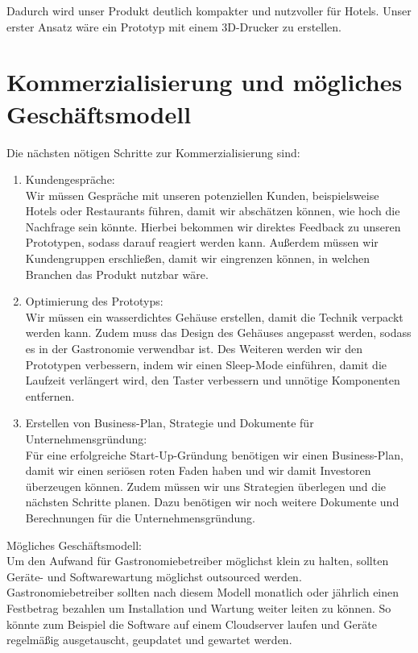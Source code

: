 Dadurch wird unser Produkt deutlich kompakter und nutzvoller für Hotels. Unser erster Ansatz wäre ein Prototyp mit einem 3D-Drucker zu erstellen. 
\section{Kommerzialisierung und mögliches Geschäftsmodell}
Die nächsten nötigen Schritte zur Kommerzialisierung sind:
\begin{enumerate}
    \item Kundengespräche:\\
    Wir müssen Gespräche mit unseren potenziellen Kunden, beispielsweise Hotels oder Restaurants führen, damit wir abschätzen können, wie hoch die Nachfrage sein könnte. Hierbei bekommen wir direktes Feedback zu unseren Prototypen, sodass darauf reagiert werden kann. Außerdem müssen wir Kundengruppen erschließen, damit wir eingrenzen können, in welchen Branchen das Produkt nutzbar wäre.
    \item Optimierung des Prototyps:\\
    Wir müssen ein wasserdichtes Gehäuse erstellen, damit die Technik verpackt werden kann. Zudem muss das Design des Gehäuses angepasst werden, sodass es in der Gastronomie verwendbar ist. Des Weiteren werden wir den Prototypen verbessern, indem wir einen Sleep-Mode einführen, damit die Laufzeit verlängert wird, den Taster verbessern und unnötige Komponenten entfernen.
    \item Erstellen von Business-Plan, Strategie und Dokumente für Unternehmensgründung:\\
    Für eine erfolgreiche Start-Up-Gründung benötigen wir einen Business-Plan, damit wir einen seriösen roten Faden haben und wir damit Investoren überzeugen können. Zudem müssen wir uns Strategien überlegen und die nächsten Schritte planen. Dazu benötigen wir noch weitere Dokumente und Berechnungen für die Unternehmensgründung.
\end{enumerate}

 Mögliches Geschäftsmodell: \\
Um den Aufwand für Gastronomiebetreiber möglichst klein zu halten, sollten Geräte- und Softwarewartung möglichst outsourced werden. Gastronomiebetreiber sollten nach diesem Modell monatlich oder jährlich einen Festbetrag bezahlen um Installation und Wartung weiter leiten zu können. So könnte zum Beispiel die Software auf einem Cloudserver laufen und Geräte regelmäßig ausgetauscht, geupdatet und gewartet werden.

\nocite{online:getting-started-load-cells}
\nocite{doc:getting-started}
\nocite{wiki:load-cell}
\nocite{wiki:Force-sensing-resistor}
\nocite{wiki:Piezoelectric-sensor}
\nocite{online:ic880a-gateway}
\nocite{online:datalink}
\nocite{online:lorawan-security}
\nocite{excel:lorawan-airtime}
\nocite{picture:spreading-factor}
\nocite{picture:lorawan}
\nocite{doc:rn2483}
\nocite{doc:lora-documentation}

\printbibliography
